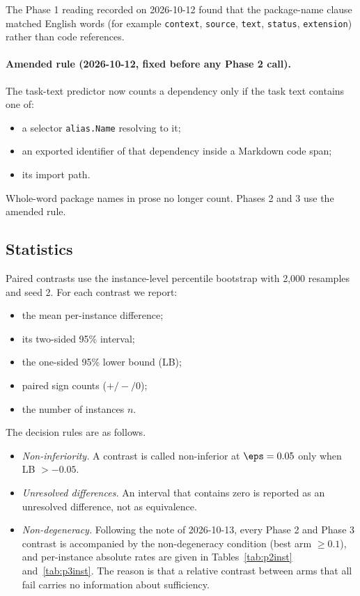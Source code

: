 The Phase 1 reading recorded on 2026-10-12 found that the package-name clause matched English words (for example \texttt{context}, \texttt{source}, \texttt{text}, \texttt{status}, \texttt{extension}) rather than code references.

\paragraph{Amended rule (2026-10-12, fixed before any Phase 2 call).} The task-text predictor now counts a dependency only if the task text contains one of:
\begin{itemize}
\item a selector \texttt{alias.Name} resolving to it;
\item an exported identifier of that dependency inside a Markdown code span;
\item its import path.
\end{itemize}
Whole-word package names in prose no longer count. Phases 2 and 3 use the amended rule.

\subsection{Statistics}

Paired contrasts use the instance-level percentile bootstrap with 2,000 resamples and seed 2. For each contrast we report:
\begin{itemize}
\item the mean per-instance difference;
\item its two-sided 95\% interval;
\item the one-sided 95\% lower bound (LB);
\item paired sign counts ($+/-/0$);
\item the number of instances $n$.
\end{itemize}

The decision rules are as follows.
\begin{itemize}
\item \emph{Non-inferiority.} A contrast is called non-inferior at $\eps = 0.05$ only when LB $> -0.05$.
\item \emph{Unresolved differences.} An interval that contains zero is reported as an unresolved difference, not as equivalence.
\item \emph{Non-degeneracy.} Following the note of 2026-10-13, every Phase 2 and Phase 3 contrast is accompanied by the non-degeneracy condition (best arm $\geq 0.1$), and per-instance absolute rates are given in Tables~\ref{tab:p2inst} and~\ref{tab:p3inst}. The reason is that a relative contrast between arms that all fail carries no information about sufficiency.
\end{itemize}

